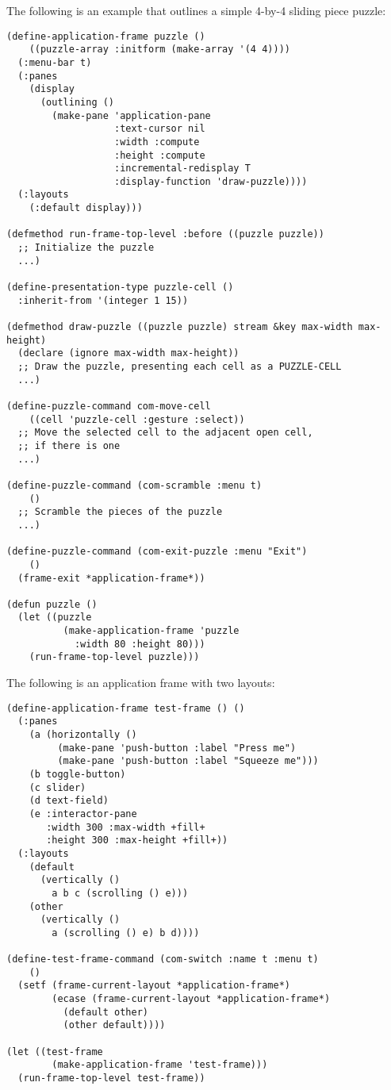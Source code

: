 The following is an example that outlines a simple 4-by-4 sliding piece puzzle:

\begin{verbatim}
(define-application-frame puzzle ()
    ((puzzle-array :initform (make-array '(4 4))))
  (:menu-bar t)
  (:panes
    (display
      (outlining ()
        (make-pane 'application-pane
                   :text-cursor nil
                   :width :compute
                   :height :compute
                   :incremental-redisplay T
                   :display-function 'draw-puzzle))))
  (:layouts
    (:default display)))

(defmethod run-frame-top-level :before ((puzzle puzzle))
  ;; Initialize the puzzle
  ...)

(define-presentation-type puzzle-cell ()
  :inherit-from '(integer 1 15))

(defmethod draw-puzzle ((puzzle puzzle) stream &key max-width max-height)
  (declare (ignore max-width max-height))
  ;; Draw the puzzle, presenting each cell as a PUZZLE-CELL
  ...)

(define-puzzle-command com-move-cell
    ((cell 'puzzle-cell :gesture :select))
  ;; Move the selected cell to the adjacent open cell,
  ;; if there is one
  ...)

(define-puzzle-command (com-scramble :menu t)
    ()
  ;; Scramble the pieces of the puzzle
  ...)

(define-puzzle-command (com-exit-puzzle :menu "Exit")
    ()
  (frame-exit *application-frame*))

(defun puzzle ()
  (let ((puzzle 
          (make-application-frame 'puzzle 
            :width 80 :height 80)))
    (run-frame-top-level puzzle)))
\end{verbatim}

The following is an application frame with two layouts:

\begin{verbatim}
(define-application-frame test-frame () ()
  (:panes
    (a (horizontally ()
         (make-pane 'push-button :label "Press me")
         (make-pane 'push-button :label "Squeeze me")))
    (b toggle-button)
    (c slider)
    (d text-field)
    (e :interactor-pane
       :width 300 :max-width +fill+
       :height 300 :max-height +fill+))
  (:layouts
    (default 
      (vertically ()
        a b c (scrolling () e)))
    (other
      (vertically ()
        a (scrolling () e) b d))))

(define-test-frame-command (com-switch :name t :menu t)
    ()
  (setf (frame-current-layout *application-frame*)
        (ecase (frame-current-layout *application-frame*)
          (default other)
          (other default))))

(let ((test-frame 
        (make-application-frame 'test-frame)))
  (run-frame-top-level test-frame))
\end{verbatim}

